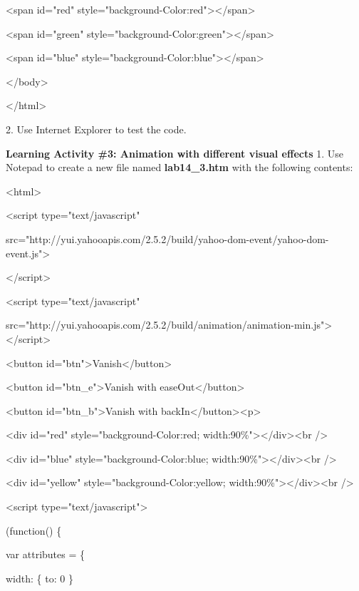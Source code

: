\documentclass[
]{article}
\begin{document}
\textless span id="red"
style="background-Color:red"\textgreater\textless/span\textgreater{}

\textless span id="green"
style="background-Color:green"\textgreater\textless/span\textgreater{}

\textless span id="blue"
style="background-Color:blue"\textgreater\textless/span\textgreater{}

\textless/body\textgreater{}

\textless/html\textgreater{}

2. Use Internet Explorer to test the code.

\textbf{Learning Activity \#3: Animation with different visual effects}
1. Use Notepad to create a new file named \textbf{lab14\_3.htm} with the
following contents:

\textless html\textgreater{}

\textless script type="text/javascript"

src="http://yui.yahooapis.com/2.5.2/build/yahoo-dom-event/yahoo-dom-event.js"\textgreater{}

\textless/script\textgreater{}

\textless script type="text/javascript"

src="http://yui.yahooapis.com/2.5.2/build/animation/animation-min.js"\textgreater\textless/script\textgreater{}

\textless button
id="btn"\textgreater Vanish\textless/button\textgreater{}

\textless button id="btn\_e"\textgreater Vanish with
easeOut\textless/button\textgreater{}

\textless button id="btn\_b"\textgreater Vanish with
backIn\textless/button\textgreater\textless p\textgreater{}

\textless div id="red" style="background-Color:red;
width:90\%"\textgreater\textless/div\textgreater\textless br
/\textgreater{}

\textless div id="blue" style="background-Color:blue;
width:90\%"\textgreater\textless/div\textgreater\textless br
/\textgreater{}

\textless div id="yellow" style="background-Color:yellow;
width:90\%"\textgreater\textless/div\textgreater\textless br
/\textgreater{}

\textless script type="text/javascript"\textgreater{}

(function() \{

var attributes = \{

width: \{ to: 0 \}
\end{document}
